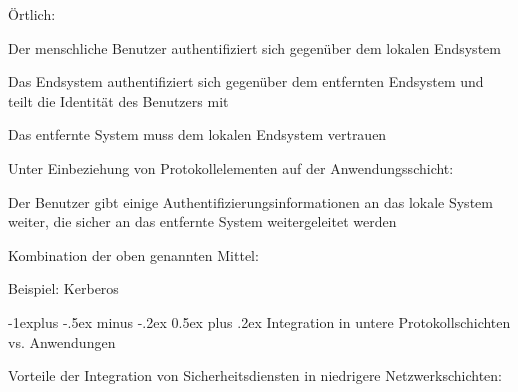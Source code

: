 \documentclass[a4paper]{article}
\makeatletter
\renewcommand{\subsection}{\@startsection{subsection}{2}{0mm}%
 {-1explus -.5ex minus -.2ex}%
 {0.5ex plus .2ex}%
 {\normalfont\normalsize\bfseries}}
\makeatother
\begin{document}
\begin{multicols}{3}
\begin{itemize*}
            \begin{itemize*}
                  \item Örtlich:
                  \begin{itemize*} \item Der menschliche Benutzer authentifiziert sich gegenüber dem lokalen Endsystem \item Das Endsystem authentifiziert sich gegenüber dem entfernten Endsystem und teilt die Identität des Benutzers mit \item Das entfernte System muss dem lokalen Endsystem vertrauen \end{itemize*}
                  \item Unter Einbeziehung von Protokollelementen auf der Anwendungsschicht:
                  \begin{itemize*} \item Der Benutzer gibt einige Authentifizierungsinformationen an das lokale System weiter, die sicher an das entfernte System weitergeleitet werden \end{itemize*}
                  \item Kombination der oben genannten Mittel:
                  \begin{itemize*} \item Beispiel: Kerberos \end{itemize*}
            \end{itemize*}
      \end{itemize*}


      \subsection{Integration in untere Protokollschichten vs.
            Anwendungen}

      \begin{itemize*}
            \item
            Vorteile der Integration von Sicherheitsdiensten in niedrigere
            Netzwerkschichten:


\end{itemize*}
\end{multicols}
\end{document}
